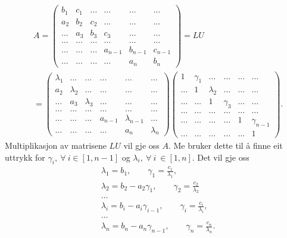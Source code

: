 \documentclass[11pt, a4paper]{article}
\begin{document}
    \begin{align*}
      &A =
      \begin{pmatrix}
        b_1 & c_1 & \dots & \dots & \dots & \dots \\
        a_2 & b_2 & c_2 & \dots & \dots & \dots \\
        \dots & a_3 & b_3 & c_3 & \dots & \dots \\
        \dots & \dots & \dots & \dots & \dots & \dots \\
        \dots & \dots & \dots & a_{n-1} & b_{n-1} & c_{n-1} \\
        \dots & \dots & \dots & \dots & a_n & b_n
      \end{pmatrix} = LU\\
      &=
      \begin{pmatrix}
        \lambda_1 & \dots & \dots & \dots & \dots & \dots \\
        a_2 & \lambda_2 & \dots & \dots & \dots & \dots \\
        \dots & a_3 & \lambda_3 & \dots & \dots & \dots \\
        \dots & \dots & \dots & \dots & \dots & \dots \\
        \dots & \dots & \dots & a_{n-1} & \lambda_{n-1} & \dots \\
        \dots & \dots & \dots & \dots & a_n & \lambda_n 
      \end{pmatrix}
      \begin{pmatrix}
        1 & \gamma_1  & \dots & \dots & \dots & \dots \\
        \dots & 1 & \lambda_2 & \dots & \dots & \dots \\
        \dots & \dots & 1 & \gamma_3 & \dots & \dots \\
        \dots & \dots & \dots & \dots & \dots & \dots \\
        \dots & \dots & \dots & \dots & 1 & \gamma_{n-1} \\
        \dots & \dots & \dots & \dots & \dots & 1 
      \end{pmatrix}.
    \end{align*}
    Multiplikasjon av matrisene $LU$ vil gje oss $A$. Me bruker dette til å finne eit uttrykk for 
    $\gamma_i, \ \forall \ i \in [1, n-1]$ og $\lambda_i, \ \forall \ i \ \in [1, n]$. Det vil gje oss
    \begin{align*}
      &\lambda_1 = b_1, \qquad \gamma_1 = \frac{c_1}{\lambda_1}, \\
      &\lambda_2 = b_2 - a_2\gamma_1, \qquad \gamma_2 = \frac{c_2}{\lambda_2} \\ 
      &\dots \\
      &\lambda_i = b_i - a_i\gamma_{i-1}, \qquad \gamma_i = \frac{c_i}{\lambda_{i}}, \\
      &\dots \\
      &\lambda_n = b_n - a_n\gamma_{n-1}, \qquad \gamma_n = \frac{c_n}{\lambda_n}.
    \end{align*}
\end{document}
